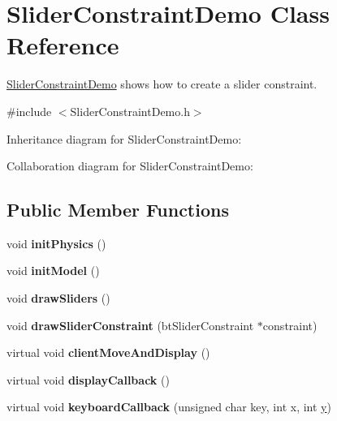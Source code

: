 \hypertarget{class_slider_constraint_demo}{\section{Slider\+Constraint\+Demo Class Reference}
\label{class_slider_constraint_demo}
}


\hyperlink{class_slider_constraint_demo}{Slider\+Constraint\+Demo} shows how to create a slider constraint.  




{\ttfamily \#include $<$Slider\+Constraint\+Demo.\+h$>$}



Inheritance diagram for Slider\+Constraint\+Demo\+:


Collaboration diagram for Slider\+Constraint\+Demo\+:
\subsection*{Public Member Functions}
\begin{DoxyCompactItemize}
\item 
\hypertarget{class_slider_constraint_demo_ad3cf8a53ac50c8e30bb78c3673db20f7}{void {\bfseries init\+Physics} ()}\label{class_slider_constraint_demo_ad3cf8a53ac50c8e30bb78c3673db20f7}

\item 
\hypertarget{class_slider_constraint_demo_aca7f257ca25f8252995fd488a2fa737a}{void {\bfseries init\+Model} ()}\label{class_slider_constraint_demo_aca7f257ca25f8252995fd488a2fa737a}

\item 
\hypertarget{class_slider_constraint_demo_a0c4d71f756b1816db77a24b6dcfb92f4}{void {\bfseries draw\+Sliders} ()}\label{class_slider_constraint_demo_a0c4d71f756b1816db77a24b6dcfb92f4}

\item 
\hypertarget{class_slider_constraint_demo_a6867d8fbad30c004f0e2e613be41fcd3}{void {\bfseries draw\+Slider\+Constraint} (bt\+Slider\+Constraint $\ast$constraint)}\label{class_slider_constraint_demo_a6867d8fbad30c004f0e2e613be41fcd3}

\item 
\hypertarget{class_slider_constraint_demo_a5dca7b79c2f45ec30cb0c48251d188bf}{virtual void {\bfseries client\+Move\+And\+Display} ()}\label{class_slider_constraint_demo_a5dca7b79c2f45ec30cb0c48251d188bf}

\item 
\hypertarget{class_slider_constraint_demo_a5b2107cf69cc3047d53f7cc64984e785}{virtual void {\bfseries display\+Callback} ()}\label{class_slider_constraint_demo_a5b2107cf69cc3047d53f7cc64984e785}

\item 
\hypertarget{class_slider_constraint_demo_ae1e88d2f6ac1326517786682b5d82f64}{virtual void {\bfseries keyboard\+Callback} (unsigned char key, int x, int \hyperlink{_ice_utils_8h_aa7ffaed69623192258fb8679569ff9ba}{y})}\label{class_slider_constraint_demo_ae1e88d2f6ac1326517786682b5d82f64}

\end{DoxyCompactItemize}
